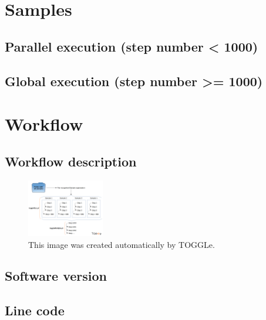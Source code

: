 \documentclass[a4paper]{article}
\begin{document}


\section{Samples}

\subsection{Parallel execution (step number < 1000)}



\subsection{Global execution (step number >= 1000)}


\section{Workflow}

\subsection{Workflow description}

\begin{figure}[ht]
\centering
\includegraphics[width=0.3\textwidth]{togglePipeline.png}
\caption{\label{fig:worflow}This image was created automatically by TOGGLe.}
\end{figure}

\subsection{Software version}


 

\subsection{Line code}
\end{document}
